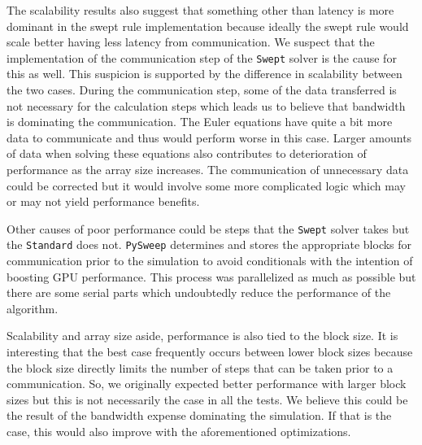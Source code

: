 \documentclass[journal,article,submit,moreauthors,pdftex]{Definitions/mdpi}
\def\pysweep{\texttt{PySweep}}
\def\Swept{\texttt{Swept}}
\def\Standard{\texttt{Standard}}
\begin{document}
\begin{paracol}{2}
The scalability results also suggest that something other than latency is more dominant in the swept rule implementation because ideally the swept rule would scale better having less latency from communication. We suspect that the implementation of the communication step of the \Swept{} solver is the cause for this as well. This suspicion is supported by the difference in scalability between the two cases. During the communication step, some of the data transferred is not necessary for the calculation steps which leads us to believe that bandwidth is dominating the communication. The Euler equations have quite a bit more data to communicate and thus would perform worse in this case. Larger amounts of data when solving these equations also contributes to deterioration of performance as the array size increases. The communication of unnecessary data could be corrected but it would involve some more complicated logic which may or may not yield performance benefits.

Other causes of poor performance could be steps that the \Swept{} solver takes but the \Standard{} does not. \pysweep{} determines and stores the appropriate blocks for communication prior to the simulation to avoid conditionals with the intention of boosting GPU performance. This process was parallelized as much as possible but there are some serial parts which undoubtedly reduce the performance of the algorithm. 

Scalability and array size aside, performance is also tied to the block size. It is interesting that the best case frequently occurs between lower block sizes because the block size directly limits the number of steps that can be taken prior to a communication. So, we originally expected better performance with larger block sizes but this is not necessarily the case in all the tests. We believe this could be the result of the bandwidth expense dominating the simulation. If that is the case, this would also improve with the aforementioned optimizations.

\end{paracol}
\end{document}
